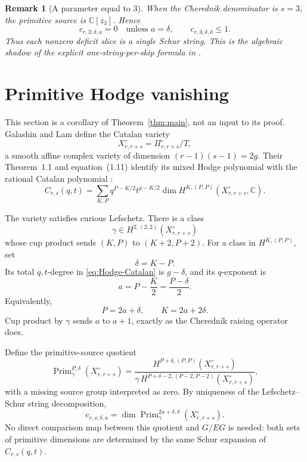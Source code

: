 \documentclass[11pt]{article}
\newtheorem{remark}[theorem]{Remark}
\newcommand{\C}{\mathbb{C}}
\newcommand{\Prim}{\operatorname{Prim}}
\begin{document}
\begin{remark}[A parameter equal to $3$]\label{rem:rank-three}
When the Cherednik denominator is $s=3$, the primitive source is
$\C[z_3]$.  Hence
\[
 c_{r,3;\delta,a}=0\quad\text{unless }a=\delta,
 \qquad
 c_{r,3;\delta,\delta}\leq1.
\]
Thus each nonzero deficit slice is a single Schur string.  This is the
algebraic shadow of the explicit one-string-per-skip formula in
\cite{KaliszewskiLi}.
\end{remark}

\section{Primitive Hodge vanishing}\label{sec:Hodge}

This section is a corollary of Theorem~\ref{thm:main}, not an input to
its proof.  Galashin and Lam define the Catalan variety
\[
 X_{r,r+s}^{\circ}=\Pi_{r,r+s}^{\circ}/T,
\]
a smooth affine complex variety of dimension
$(r-1)(s-1)=2g$.  Their Theorem~1.1 and equation~(1.11) identify its
mixed Hodge polynomial with the rational Catalan polynomial
\cite{GalashinLam}:
\begin{equation}\label{eq:Hodge-Catalan}
 C_{r,s}(q,t)
 =\sum_{K,P}
 q^{P-K/2}t^{g-K/2}
 \dim H^{K,(P,P)}(X_{r,r+s}^{\circ},\C).
\end{equation}

The variety satisfies curious Lefschetz.  There is a class
\[
 \gamma\in H^{2,(2,2)}(X_{r,r+s}^{\circ})
\]
whose cup product sends $(K,P)$ to $(K+2,P+2)$.  For a class in
$H^{K,(P,P)}$, set
\[
 \delta=K-P.
\]
Its total $q,t$-degree in \eqref{eq:Hodge-Catalan} is $g-\delta$, and
its $q$-exponent is
\[
 a=P-\frac K2=\frac{P-\delta}{2}.
\]
Equivalently,
\begin{equation}\label{eq:Hodge-change}
 P=2a+\delta,
 \qquad
 K=2a+2\delta.
\end{equation}
Cup product by $\gamma$ sends $a$ to $a+1$, exactly as the Cherednik
raising operator does.

Define the primitive-source quotient
\begin{equation}\label{eq:Hodge-primitive}
 \Prim_\gamma^{P,\delta}(X_{r,r+s}^{\circ})
 =
 \frac{H^{P+\delta,(P,P)}(X_{r,r+s}^{\circ})}
 {\gamma\,H^{P+\delta-2,(P-2,P-2)}(X_{r,r+s}^{\circ})},
\end{equation}
with a missing source group interpreted as zero.  By uniqueness of the
Lefschetz--Schur string decomposition,
\begin{equation}\label{eq:c-Hodge-primitive}
 c_{r,s;\delta,a}
 =\dim\Prim_\gamma^{2a+\delta,\delta}
 (X_{r,r+s}^{\circ}).
\end{equation}
No direct comparison map between this quotient and $G/EG$ is needed:
both sets of primitive dimensions are determined by the same Schur
expansion of $C_{r,s}(q,t)$.
\end{document}
